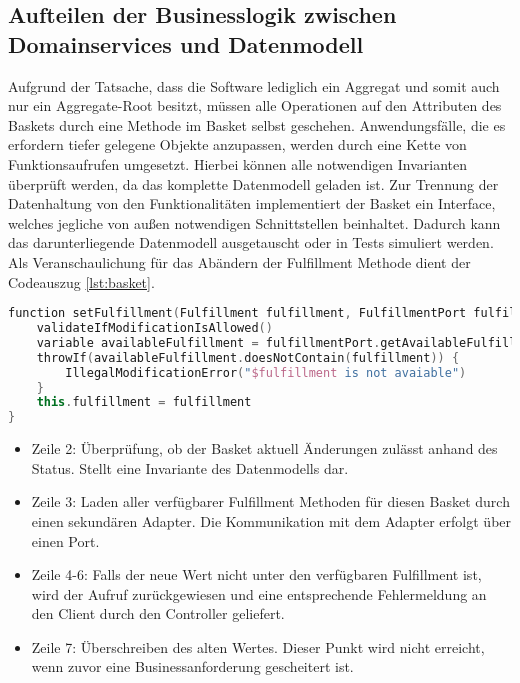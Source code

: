 \subsection{Aufteilen der Businesslogik zwischen Domainservices und Datenmodell}

Aufgrund der Tatsache, dass die Software lediglich ein Aggregat und somit auch nur ein Aggregate-Root besitzt, müssen alle Operationen auf den Attributen des Baskets durch eine Methode im Basket selbst geschehen. Anwendungsfälle, die es erfordern tiefer gelegene Objekte anzupassen, werden durch eine Kette von Funktionsaufrufen umgesetzt. Hierbei können alle notwendigen Invarianten überprüft werden, da das komplette Datenmodell geladen ist. Zur Trennung der Datenhaltung von den Funktionalitäten implementiert der Basket ein Interface, welches jegliche von außen notwendigen Schnittstellen beinhaltet. Dadurch kann das darunterliegende Datenmodell ausgetauscht oder in Tests simuliert werden. Als Veranschaulichung für das Abändern der Fulfillment Methode dient der Codeauszug \ref{lst:basket}.

\begin{minipage}{\linewidth} %
	\begin{lstlisting}[caption={Setzen der Fulfillment Methode im Basket Aggregate}, label={lst:basket}, language=Kotlin]
function setFulfillment(Fulfillment fulfillment, FulfillmentPort fulfillmentPort) {
	validateIfModificationIsAllowed()
	variable availableFulfillment = fulfillmentPort.getAvailableFulfillment(outletId)
	throwIf(availableFulfillment.doesNotContain(fulfillment)) {
		IllegalModificationError("$fulfillment is not avaiable")
	}
	this.fulfillment = fulfillment
}
	\end{lstlisting}
\end{minipage}

\begin{itemize}[noitemsep,nolistsep]
	\item Zeile 2: Überprüfung, ob der Basket aktuell Änderungen zulässt anhand des Status. Stellt eine Invariante des Datenmodells dar.
	\item Zeile 3: Laden aller verfügbarer Fulfillment Methoden für diesen Basket durch einen sekundären Adapter. Die Kommunikation mit dem Adapter erfolgt über einen Port.
	\item Zeile 4-6: Falls der neue Wert nicht unter den verfügbaren Fulfillment ist, wird der Aufruf zurückgewiesen und eine entsprechende Fehlermeldung an den Client durch den Controller geliefert.
	\item Zeile 7: Überschreiben des alten Wertes. Dieser Punkt wird nicht erreicht, wenn zuvor eine Businessanforderung gescheitert ist.
\end{itemize}

